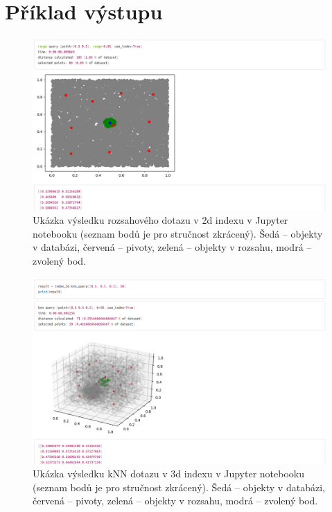 \documentclass{article}
\begin{document}
\section{Příklad výstupu}

\begin{figure}[H]
    \centering
    \includegraphics[width=\textwidth]{img/range_2d.png}
    \caption{Ukázka výsledku rozsahového dotazu v 2d indexu v Jupyter notebooku (seznam bodů je pro stručnost zkrácený). Šedá – objekty v databázi, červená – pivoty, zelená – objekty v rozsahu, modrá – zvolený bod.}
\end{figure}

\begin{figure}[H]
    \centering
    \includegraphics[width=\textwidth]{img/knn_3d.png}
    \caption{Ukázka výsledku kNN dotazu v 3d indexu v Jupyter notebooku (seznam bodů je pro stručnost zkrácený). Šedá – objekty v databázi, červená – pivoty, zelená – objekty v rozsahu, modrá – zvolený bod.}
\end{figure}
\end{document}
